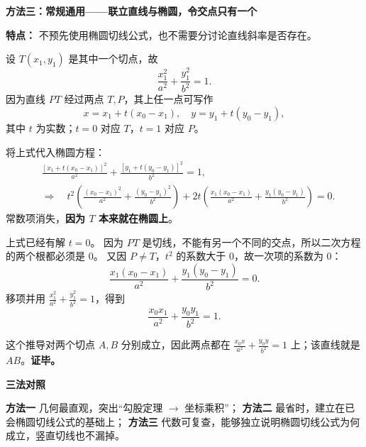 \clearpage
\begin{proofbox}
    \textbf{\textcolor{CProof}{方法三：常规通用——联立直线与椭圆，令交点只有一个}}



    \textbf{特点：} 不预先使用椭圆切线公式，也不需要分讨论直线斜率是否存在。
    \begin{description}[style=nextline, leftmargin=2.8em, labelsep=0.5em, itemsep=0.45em]
        \item[\textbf{第1步（设切点和直线）：}] 设 $T(x_1,y_1)$ 是其中一个切点，故
        \[
            \frac{x_1^2}{a^2}+\frac{y_1^2}{b^2}=1.
        \]
        因为直线 $PT$ 经过两点 $T,P$，其上任一点可写作
        \[
            x=x_1+t(x_0-x_1),\quad y=y_1+t(y_0-y_1),
        \]
        其中 $t$ 为实数；$t=0$ 对应 $T$，$t=1$ 对应 $P$。

        \item[\textbf{第2步（代入椭圆并展开）：}] 将上式代入椭圆方程：
        \[
        \begin{aligned}
           &\frac{[x_1+t(x_0-x_1)]^2}{a^2}
             +\frac{[y_1+t(y_0-y_1)]^2}{b^2}=1,\\
           &\Rightarrow\quad
           t^2\!\left(\frac{(x_0-x_1)^2}{a^2}+\frac{(y_0-y_1)^2}{b^2}\right)
           +2t\!\left(\frac{x_1(x_0-x_1)}{a^2}+\frac{y_1(y_0-y_1)}{b^2}\right)=0.
        \end{aligned}
        \]
        常数项消失，\textbf{因为 $T$ 本来就在椭圆上}。

        \item[\textbf{第3步（相切意味着只有一个交点）：}] 上式已经有解 $t=0$。
        因为 $PT$ 是切线，不能有另一个不同的交点，所以二次方程的两个根都必须是 $0$。
        又因 $P\ne T$，$t^2$ 的系数大于 $0$，故一次项的系数为 $0$：
        \[
            \frac{x_1(x_0-x_1)}{a^2}+\frac{y_1(y_0-y_1)}{b^2}=0.
        \]
        移项并用 $\frac{x_1^2}{a^2}+\frac{y_1^2}{b^2}=1$，得到
        \[
            \boxed{\frac{x_0x_1}{a^2}+\frac{y_0y_1}{b^2}=1}.
        \]

        \item[\textbf{第4步（确定切点弦）：}] 这个推导对两个切点 $A,B$ 分别成立，因此两点都在
        $\frac{x_0x}{a^2}+\frac{y_0y}{b^2}=1$ 上；该直线就是 $AB$。\textbf{证毕。}
    \end{description}

    \medskip
    \textbf{\textcolor{CProof}{三法对照}}

    \textbf{方法一} 几何最直观，突出``勾股定理 $\rightarrow$ 坐标乘积''；
    \textbf{方法二} 最省时，建立在已会椭圆切线公式的基础上；
    \textbf{方法三} 代数可复查，能够独立说明椭圆切线公式为何成立，竖直切线也不漏掉。
\end{proofbox}
